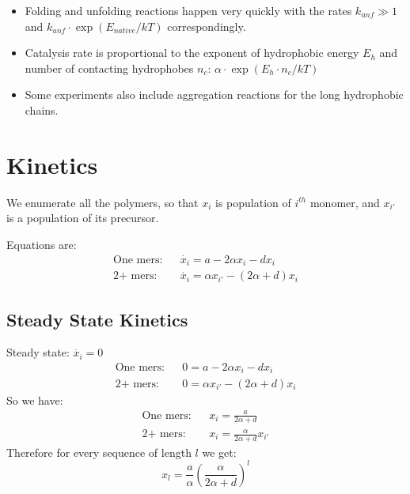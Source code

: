 \documentclass[12pt]{paper}
\newcommand{\ga}{\alpha}
\newcommand{\pt}[1]{\left( #1\right)}
\begin{document}
\begin{itemize}
\item Folding and unfolding reactions happen very quickly with the rates $k_{unf}\gg1$ and 
$k_{unf}\cdot\exp(E_{native}/kT)$ correspondingly.

\item Catalysis rate is proportional to the exponent of hydrophobic energy $E_h$ and number of 
contacting hydrophobes $n_c$: $\ga\cdot\exp(E_{h}\cdot n_{c}/kT)$

\item Some experiments also include aggregation reactions for the long hydrophobic chains.
\end{itemize}

\section{Kinetics}
We enumerate all the polymers, so that $x_i$ is population of $i^{th}$ monomer, and $x_{i'}$ is a 
population of its precursor.

Equations are:
  \begin{eqnarray}
   \mbox{One mers:}&& \dot{x_i}=a-2\ga x_i-dx_i \\
     \mbox{2+ mers:}&& \dot{x_i}=\ga x_{i'}-(2\ga+d)x_i
  \end{eqnarray}

\subsection{Steady State Kinetics}\label{sec:nowak-steady}
Steady state: $\dot{x_i}=0$
  \begin{eqnarray}
   \mbox{One mers:}&& 0=a-2\ga x_i-dx_i \\
     \mbox{2+ mers:}&& 0=\ga x_{i'}-(2\ga+d)x_i
  \end{eqnarray}
  So we have:
   \begin{eqnarray}
   \mbox{One mers:}&& x_i=\frac{a}{2\ga+d} \\
     \mbox{2+ mers:}&& x_i=\frac{\ga}{2\ga+d}x_{i'}
  \end{eqnarray}   
 Therefore for every sequence of length $l$ we get:
   \begin{equation}
   \boxed{ x_l=\frac{a}{\ga}\pt{\frac{\ga}{2\ga+d}}^l}
   \end{equation} 
\end{document}
